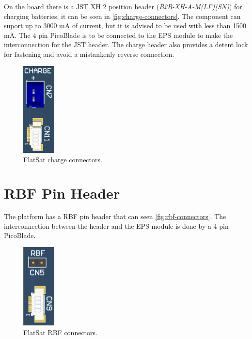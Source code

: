 On the board there is a JST XH 2 position header (\textit{B2B-XH-A-M(LF)(SN)}) for charging batteries, it can be seen in \autoref{fig:charge-connectors}. The component can suport up to 3000 mA of current, but it is advised to be used with less than 1500 mA. The 4 pin PicoBlade is to be connected to the EPS module to make the interconnection for the JST header. The charge header also provides a detent lock for fastening and avoid a mistankenly reverse connection.

\begin{figure}[!ht]
    \begin{center}
        \includegraphics[width=0.15\textwidth]{figures/charge_connectors.png}
        \caption{FlatSat charge connectors.}
        \label{fig:charge-connectors}
    \end{center}
\end{figure}

\section{RBF Pin Header}

The platform has a RBF pin header that can seen \autoref{fig:rbf-connectors}. The interconnection between the header and the EPS module is done by a 4 pin PicoBlade.

\begin{figure}[!ht]
    \begin{center}
        \includegraphics[width=0.15\textwidth]{figures/rbf_connectors.png}
        \caption{FlatSat RBF connectors.}
        \label{fig:rbf-connectors}
    \end{center}
\end{figure}

